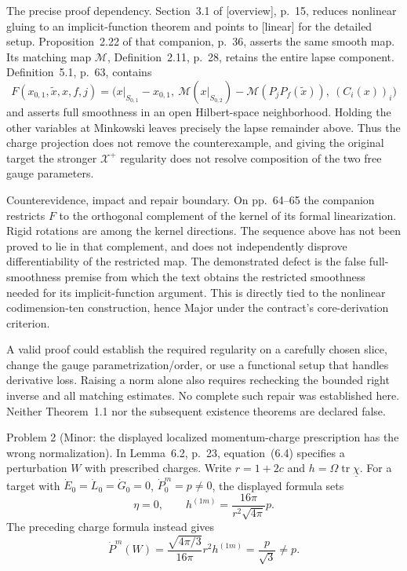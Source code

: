 \documentclass[10pt]{article}
\begin{document}
The precise proof dependency. Section 3.1 of [overview], p. 15, reduces nonlinear gluing to an implicit-function theorem and points to [linear] for the detailed setup. Proposition 2.22 of that companion, p. 36, asserts the same smooth map. Its matching map \(\mathcal M\), Definition 2.11, p. 28, retains the entire lapse component. Definition 5.1, p. 63, contains \[F(x_{0,1},\widetilde x,x,f,j)
  =\bigl(x|_{S_{0,1}}-x_{0,1},\
       \mathcal M(x|_{S_{0,2}})-\mathcal M(P_jP_f(\widetilde x)),\
       (C_i(x))_i\bigr)\] and asserts full smoothness in an open Hilbert-space neighborhood. Holding the other variables at Minkowski leaves precisely the lapse remainder above. Thus the charge projection does not remove the counterexample, and giving the original target the stronger \(\mathcal X^+\) regularity does not resolve composition of the two free gauge parameters.\par
Counterevidence, impact and repair boundary. On pp. 64–65 the companion restricts \(F\) to the orthogonal complement of the kernel of its formal linearization. Rigid rotations are among the kernel directions. The sequence above has not been proved to lie in that complement, and does not independently disprove differentiability of the restricted map. The demonstrated defect is the false full-smoothness premise from which the text obtains the restricted smoothness needed for its implicit-function argument. This is directly tied to the nonlinear codimension-ten construction, hence Major under the contract’s core-derivation criterion.\par
A valid proof could establish the required regularity on a carefully chosen slice, change the gauge parametrization/order, or use a functional setup that handles derivative loss. Raising a norm alone also requires rechecking the bounded right inverse and all matching estimates. No complete such repair was established here. Neither Theorem 1.1 nor the subsequent existence theorems are declared false.\par
Problem 2 (Minor: the displayed localized momentum-charge prescription has the wrong normalization).  In Lemma 6.2, p. 23, equation (6.4) specifies a perturbation \(W\) with prescribed charges. Write \(r=1+2c\) and \(h=\Omega\operatorname{tr}\underline\chi\). For a target with \(\dot E_0=\dot L_0=\dot G_0=0\), \(\dot P_0^m=p\ne0\), the displayed formula sets \[\eta=0,\qquad h^{(1m)}=\frac{16\pi}{r^2\sqrt{4\pi}}p.\] The preceding charge formula instead gives \[\dot P^m(W)=\frac{\sqrt{4\pi/3}}{16\pi}r^2h^{(1m)}
                =\frac{p}{\sqrt3}\ne p.\]\par
\end{document}
